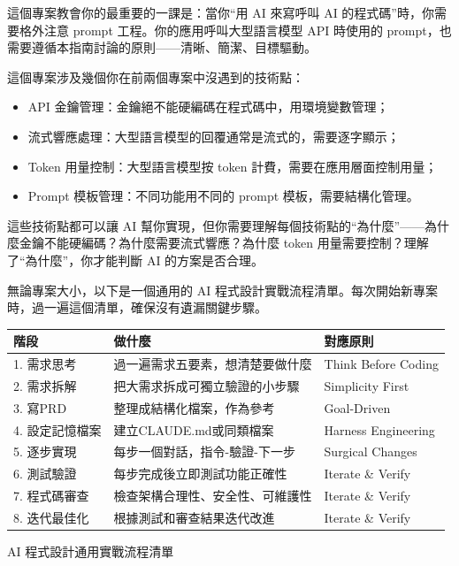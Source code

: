 這個專案教會你的最重要的一課是：當你“用 AI 來寫呼叫 AI 的程式碼”時，你需要格外注意 prompt 工程。你的應用呼叫大型語言模型 API 時使用的 prompt，也需要遵循本指南討論的原則——清晰、簡潔、目標驅動。


這個專案涉及幾個你在前兩個專案中沒遇到的技術點：

\begin{itemize}
  \item API 金鑰管理：金鑰絕不能硬編碼在程式碼中，用環境變數管理；
  \item 流式響應處理：大型語言模型的回覆通常是流式的，需要逐字顯示；
  \item Token 用量控制：大型語言模型按 token 計費，需要在應用層面控制用量；
  \item Prompt 模板管理：不同功能用不同的 prompt 模板，需要結構化管理。
\end{itemize}

這些技術點都可以讓 AI 幫你實現，但你需要理解每個技術點的“為什麼”——為什麼金鑰不能硬編碼？為什麼需要流式響應？為什麼 token 用量需要控制？理解了“為什麼”，你才能判斷 AI 的方案是否合理。


無論專案大小，以下是一個通用的 AI 程式設計實戰流程清單。每次開始新專案時，過一遍這個清單，確保沒有遺漏關鍵步驟。

\begin{center}
\begin{tabularx}{\linewidth}{|X|X|X|}
\hline
\textbf{階段} & \textbf{做什麼} & \textbf{對應原則} \tabularnewline
\hline
1. 需求思考 & 過一遍需求五要素，想清楚要做什麼 & Think Before Coding \tabularnewline
2. 需求拆解 & 把大需求拆成可獨立驗證的小步驟 & Simplicity First \tabularnewline
3. 寫PRD & 整理成結構化檔案，作為參考 & Goal-Driven \tabularnewline
4. 設定記憶檔案 & 建立CLAUDE.md或同類檔案 & Harness Engineering \tabularnewline
5. 逐步實現 & 每步一個對話，指令-驗證-下一步 & Surgical Changes \tabularnewline
6. 測試驗證 & 每步完成後立即測試功能正確性 & Iterate \& Verify \tabularnewline
7. 程式碼審查 & 檢查架構合理性、安全性、可維護性 & Iterate \& Verify \tabularnewline
8. 迭代最佳化 & 根據測試和審查結果迭代改進 & Iterate \& Verify \tabularnewline
\hline
\end{tabularx}
\end{center}

\begin{center}\small\color{gray}AI 程式設計通用實戰流程清單\end{center}


